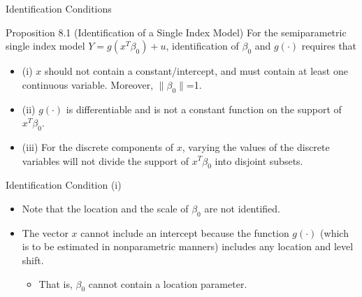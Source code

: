 \documentclass[xcolor=svgnames,dvipdfmx,cjk]{beamer}
\theoremstyle{example}
\begin{document}
\begin{frame}{Identification Conditions}
  \begin{itembox}[l]{Proposition 8.1 (Identification of a Single Index Model)}
    \quad 
    For the semiparametric single index model $Y = g(x^{T} \beta_0) + u$,
    identification of $\beta_0$ and $g(\cdot)$ requires that
    \begin{itemize}
      \item (i)
            $x$ should not contain a constant/intercept, 
            and must contain at least one continuous variable.
            Moreover, $\|\beta_0\|$=1.
      \item (ii)
            $g(\cdot)$ is differentiable 
            and is not a constant function on the support of $x^{T}\beta_0$.
      \item (iii)
            For the discrete components of $x$, 
            varying the values of the discrete variables will not divide the support of $x^{T}\beta_0$ into disjoint subsets.
    \end{itemize}
  \end{itembox}
\end{frame}

\begin{frame}{Identification Condition (i)}
\begin{itemize}
  \item Note that \alert{the location and the scale of $\beta_0$ are not identified}.
  \item The vector $x$ cannot include an intercept 
        because the function $g(\cdot)$ (which is to be estimated in nonparametric manners) includes any location and level shift.
        \begin{itemize}
          \item That is, $\beta_0$ cannot contain a location parameter.
        \end{itemize}
\end{itemize}
\end{frame}
\end{document}
